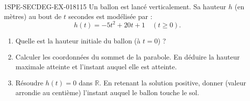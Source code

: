 \begin{exercice}{1SPE-SECDEG-EX-018}{1}{15}
Un ballon est lancé verticalement. Sa hauteur $h$ (en mètres) au bout de $t$ secondes est modélisée par :
\[h(t) = -5t^2 + 20t + 1 \quad (t \geqslant 0).\]

\begin{enumerate}
  \item Quelle est la hauteur initiale du ballon (à $t = 0$) ?
  \item Calculer les coordonnées du sommet de la parabole. En déduire la hauteur maximale atteinte et l'instant auquel elle est atteinte.
  \item Résoudre $h(t) = 0$ dans $\mathbb{R}$. En retenant la solution positive, donner (valeur arrondie au centième) l'instant auquel le ballon touche le sol.
\end{enumerate}
\end{exercice}
